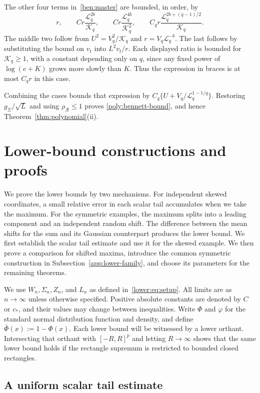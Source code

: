 \documentclass[11pt,letterpaper]{article}
\theoremstyle{remark}
\newcommand{\rh}{\rho_{\mathcal R}}
\begin{document}
The other four terms in~\eqref{ben:master} are bounded, in order, by
\[
 r,\qquad C r\frac{\mathcal L_q^{2b}}{\mathcal K_q},\qquad
 C r\frac{\mathcal L_q^{4b}}{\mathcal K_q^2},\qquad
 C_q r\frac{\mathcal L_q^{2b+(q-1)/2}}{\mathcal K_q}.
\]
The middle two follow from $U^2=V_q^2/\mathcal K_q$ and
$r=V_q\mathcal L_q^{-b}$. The last follows by substituting
the bound on $v_t$ into $L^2v_t/r$. Each displayed ratio is
bounded for $\mathcal K_q\ge1$, with a constant depending
only on $q$, since any fixed power of $\log(e+K)$ grows more
slowly than $K$. Thus the expression in braces is at most
$C_qr$ in this case.

Combining the cases bounds that expression by
$C_q\{U+V_q/\mathcal L_q^{1-1/q}\}$. Restoring
$g_\Sigma/\sqrt L$ and using $\rh\le1$ proves
\eqref{poly:bennett-bound}, and hence
Theorem~\ref{thm:polynomial}\textup{(ii)}.

\section{Lower-bound constructions and proofs}\label{app:sharpness-proofs}

We prove the lower bounds by two mechanisms. For independent skewed
coordinates, a small relative error in each scalar tail accumulates
when we take the maximum. For the symmetric examples, the maximum
splits into a leading component and an independent random shift.
The difference between the mean shifts for the sum and its Gaussian
counterpart produces the lower bound. We first establish the scalar
tail estimate and use it for the skewed example. We then prove a
comparison for shifted maxima, introduce the common symmetric
construction in Subsection~\ref{app:lower-family}, and choose its
parameters for the remaining theorems.

We use $W_n,\Sigma_n,Z_n$, and $L_n$ as defined
in~\eqref{lower:eq:setup}. All limits are as $n\to\infty$ unless
otherwise specified. Positive absolute constants are denoted by
$C$ or $c_*$, and their values may change between inequalities.
Write $\Phi$ and $\varphi$ for the standard normal distribution
function and density, and define $\bar\Phi(x):=1-\Phi(x)$.
Each lower bound will be witnessed by a lower orthant. Intersecting
that orthant with $[-R,R]^p$ and letting $R\to\infty$ shows that
the same lower bound holds if the rectangle supremum is restricted
to bounded closed rectangles.

\subsection{A uniform scalar tail estimate}
\label{app:moderate-tail-proof}
\end{document}
